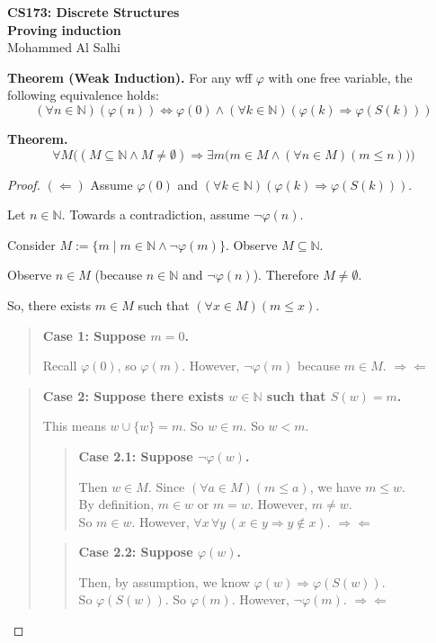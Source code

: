 \documentclass[12pt]{article}
\newcommand{\contra}{\ensuremath{\Rightarrow\Leftarrow}}
\theoremstyle{proofstyle}
\newenvironment{caseblock}[1]{%
  \begin{quote}
  \noindent\textbf{#1}\ %
}{%
  \end{quote}
}
\renewcommand{\maketitle}{%
  \begin{flushleft}
    {\Large\bfseries CS173: Discrete Structures}\\[0.3em]
    {\Large\bfseries Proving induction}\\[0.5em]
    {\normalsize Mohammed Al Salhi}
  \end{flushleft}
  \vspace{1em}
}
\begin{document}
\maketitle

\noindent\textbf{Theorem (Weak Induction).} For any wff $\varphi$ with one free variable, the following equivalence holds:
\[
(\forall n \in \mathbb{N})(\varphi(n)) \iff \varphi(0) \land (\forall k \in \mathbb{N})(\varphi(k) \Rightarrow \varphi(S(k)))
\]

\noindent\textbf{Theorem.}
\[
\forall M\bigl((M \subseteq \mathbb{N} \land M \neq \emptyset)
\Rightarrow \exists m\bigl(m \in M \land (\forall n \in M)(m \leq n)\bigr)\bigr)
\]

\begin{proof}[Proof]

\noindent$(\Leftarrow)$ Assume $\varphi(0)$ and $(\forall k \in \mathbb{N})(\varphi(k) \Rightarrow \varphi(S(k)))$.

Let $n \in \mathbb{N}$. Towards a contradiction, assume $\neg\varphi(n)$.

Consider $M := \{m \mid m \in \mathbb{N} \land \neg\varphi(m)\}$. Observe $M \subseteq \mathbb{N}$.

Observe $n \in M$ (because $n \in \mathbb{N}$ and $\neg\varphi(n)$). Therefore $M \neq \emptyset$.

So, there exists $m \in M$ such that $(\forall x \in M)(m \leq x)$.

\begin{caseblock}{Case 1: Suppose $m = 0$.}
  Recall $\varphi(0)$, so $\varphi(m)$. However, $\neg\varphi(m)$ because $m \in M$. \contra
\end{caseblock}

\begin{caseblock}{Case 2: Suppose there exists $w \in \mathbb{N}$ such that $S(w) = m$.}
  This means $w \cup \{w\} = m$. So $w \in m$. So $w < m$.

  \begin{caseblock}{Case 2.1: Suppose $\neg\varphi(w)$.}
    Then $w \in M$. Since $(\forall a \in M)(m \leq a)$, we have $m \leq w$.\\
    By definition, $m \in w$ or $m = w$. However, $m \neq w$.\\
    So $m \in w$. However, $\forall x\, \forall y\,(x \in y \Rightarrow y \notin x)$. \contra
  \end{caseblock}

  \begin{caseblock}{Case 2.2: Suppose $\varphi(w)$.}
    Then, by assumption, we know $\varphi(w) \Rightarrow \varphi(S(w))$.\\
    So $\varphi(S(w))$. So $\varphi(m)$. However, $\neg\varphi(m)$. \contra
  \end{caseblock}
\end{caseblock}


\end{proof}
\end{document}
